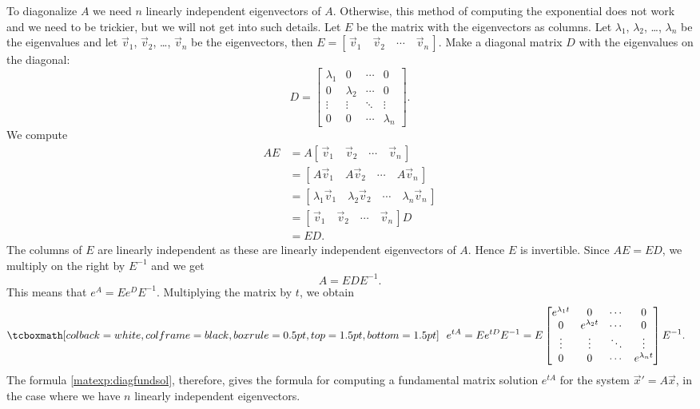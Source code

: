 To diagonalize $A$
we need $n$ linearly independent eigenvectors of $A$.
Otherwise, this method of computing the exponential does not work and we need to be trickier, but we will
not get into such details.
Let $E$ be the matrix with the eigenvectors as columns.  
Let $\lambda_1$, $\lambda_2$, \ldots, $\lambda_n$ be the eigenvalues and
let $\vec{v}_1$, $\vec{v}_2$, \ldots, $\vec{v}_n$ be the eigenvectors, then
$E = [\, \vec{v}_1 \quad \vec{v}_2 \quad \cdots \quad \vec{v}_n \,]$.
Make a diagonal matrix $D$ with the eigenvalues on the diagonal:
\begin{equation*}
D =
\begin{bmatrix}
\lambda_1 & 0 & \cdots & 0 \\
0 & \lambda_2 & \cdots & 0 \\
\vdots & \vdots & \ddots & \vdots \\
0 & 0 & \cdots & \lambda_n
\end{bmatrix} .
\end{equation*}
We compute
\begin{equation*}
\begin{split}
AE & = A 
[\, \vec{v}_1 \quad \vec{v}_2 \quad \cdots \quad \vec{v}_n \,]
\\
& =
[\, A\vec{v}_1 \quad A\vec{v}_2 \quad \cdots \quad A\vec{v}_n \,]
\\
& =
[\, \lambda_1 \vec{v}_1 \quad \lambda_2 \vec{v}_2 \quad \cdots \quad
\lambda_n \vec{v}_n \,]
\\
& =
[\, \vec{v}_1 \quad \vec{v}_2 \quad \cdots \quad \vec{v}_n \,] D
\\
& =
ED .
\end{split}
\end{equation*}
The columns of $E$ are linearly independent as these are
linearly independent eigenvectors of
$A$.  Hence $E$ is invertible.
Since $AE = ED$, we multiply on the right by $E^{-1}$ and we get
\begin{equation*}
A = E D E^{-1}.
\end{equation*}
This means that $e^A = E e^D E^{-1}$.  Multiplying the matrix by $t$, we obtain
\begin{equation} \label{matexp:diagfundsol}
\mybxbg{~~
e^{tA} = 
Ee^{tD}E^{-1} = 
E
\begin{bmatrix}
e^{\lambda_1 t} & 0 & \cdots & 0 \\
0 & e^{\lambda_2 t} & \cdots & 0 \\
\vdots & \vdots & \ddots & \vdots \\
0 & 0 & \cdots & e^{\lambda_n t}
\end{bmatrix} 
E^{-1} .
~~}
\end{equation}
The formula \eqref{matexp:diagfundsol}, therefore, gives the formula
for computing a fundamental matrix solution $e^{tA}$ for the
system ${\vec{x}}' = A \vec{x}$, in the case where we have
$n$ linearly independent eigenvectors.

